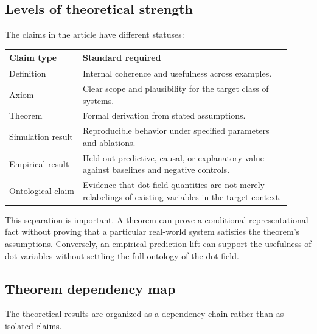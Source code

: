 \documentclass[11pt]{article}
\theoremstyle{remark}
\begin{document}
\subsection{Levels of theoretical strength}\label{levels-theoretical-strength}

The claims in the article have different statuses:

\begin{longtable}{L{0.24\linewidth}L{0.68\linewidth}}
\toprule
\textbf{Claim type} & \textbf{Standard required}\\
\midrule
Definition & Internal coherence and usefulness across examples.\\
Axiom & Clear scope and plausibility for the target class of systems.\\
Theorem & Formal derivation from stated assumptions.\\
Simulation result & Reproducible behavior under specified parameters and ablations.\\
Empirical result & Held-out predictive, causal, or explanatory value against baselines and negative controls.\\
Ontological claim & Evidence that dot-field quantities are not merely relabelings of existing variables in the target context.\\
\bottomrule
\end{longtable}

This separation is important. A theorem can prove a conditional
representational fact without proving that a particular real-world
system satisfies the theorem's assumptions. Conversely, an empirical
prediction lift can support the usefulness of dot variables without
settling the full ontology of the dot field.

\subsection{Theorem dependency map}\label{theorem-dependency-map}

The theoretical results are organized as a dependency chain rather than
as isolated claims.
\end{document}
